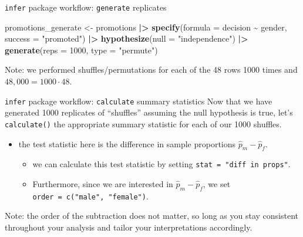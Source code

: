 \documentclass[
  ignorenonframetext,
]{beamer}
\newenvironment{Shaded}{\begin{snugshade}}{\end{snugshade}}
\newcommand{\AttributeTok}[1]{\textcolor[rgb]{0.13,0.29,0.53}{#1}}
\newcommand{\DecValTok}[1]{\textcolor[rgb]{0.00,0.00,0.81}{#1}}
\newcommand{\FunctionTok}[1]{\textcolor[rgb]{0.13,0.29,0.53}{\textbf{#1}}}
\newcommand{\NormalTok}[1]{#1}
\newcommand{\OtherTok}[1]{\textcolor[rgb]{0.56,0.35,0.01}{#1}}
\newcommand{\SpecialCharTok}[1]{\textcolor[rgb]{0.81,0.36,0.00}{\textbf{#1}}}
\newcommand{\StringTok}[1]{\textcolor[rgb]{0.31,0.60,0.02}{#1}}
\providecommand{\tightlist}{%
  \setlength{\itemsep}{0pt}\setlength{\parskip}{0pt}}
\begin{document}
\begin{frame}[fragile]{\texttt{infer} package workflow:
\texttt{generate} replicates}
\label{infer-package-workflow-generate-replicates-1}
\begin{Shaded}
\begin{Highlighting}[]
\NormalTok{promotions\_generate }\OtherTok{\textless{}{-}}\NormalTok{ promotions }\SpecialCharTok{|\textgreater{}} 
  \FunctionTok{specify}\NormalTok{(}\AttributeTok{formula =}\NormalTok{ decision }\SpecialCharTok{\textasciitilde{}}\NormalTok{ gender, }
          \AttributeTok{success =} \StringTok{"promoted"}\NormalTok{) }\SpecialCharTok{|\textgreater{}} 
  \FunctionTok{hypothesize}\NormalTok{(}\AttributeTok{null =} \StringTok{"independence"}\NormalTok{) }\SpecialCharTok{|\textgreater{}} 
  \FunctionTok{generate}\NormalTok{(}\AttributeTok{reps =} \DecValTok{1000}\NormalTok{, }\AttributeTok{type =} \StringTok{"permute"}\NormalTok{)}
\end{Highlighting}
\end{Shaded}

Note: we performed shuffles/permutations for each of the 48 rows 1000
times and \(48,000=1000\cdot 48\).
\end{frame}

\begin{frame}[fragile]{\texttt{infer} package workflow:
\texttt{calculate} summary statistics}
\label{infer-package-workflow-calculate-summary-statistics}
Now that we have generated 1000 replicates of ``shuffles'' assuming the
null hypothesis is true, let's \texttt{calculate()} the appropriate
summary statistic for each of our 1000 shuffles.

\begin{itemize}
\item
  the test statistic here is the difference in sample proportions
  \(\hat{p}_m-\hat{p}_f\).

  \begin{itemize}
  \tightlist
  \item
    we can calculate this test statistic by setting
    \texttt{stat\ =\ "diff\ in\ props"}.
  \item
    Furthermore, since we are interested in \(\hat{p}_m-\hat{p}_f\), we
    set \texttt{order\ =\ c("male",\ "female")}.
  \end{itemize}
\end{itemize}

Note: the order of the subtraction does not matter, so long as you stay
consistent throughout your analysis and tailor your interpretations
accordingly.
\end{frame}
\end{document}
